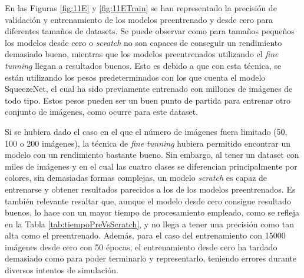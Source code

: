 \documentclass{report}
\begin{document}
En las Figuras \ref{fig:11E} y \ref{fig:11ETrain} se han representado la precisión de validación y entrenamiento de los modelos preentrenado y desde cero para diferentes tamaños de datasets. Se puede observar como para tamaños pequeños los modelos desde cero o \textit{scratch} no son capaces de conseguir un rendimiento demasiado bueno, mientras que los modelos preentrenados utilizando el \textit{fine tunning} llegan a resultados buenos. Esto es debido a que con esta técnica, se están utilizando los pesos predeterminados con los que cuenta el modelo SqueezeNet, el cual ha sido previamente entrenado con millones de imágenes de todo tipo. Estos pesos pueden ser un buen punto de partida para entrenar otro conjunto de imágenes, como ocurre para este dataset.

Si se hubiera dado el caso en el que el número de imágenes fuera limitado (50, 100 o 200 imágenes), la técnica de \textit{fine tunning} hubiera permitido encontrar un modelo con un rendimiento bastante bueno. Sin embargo, al tener un dataset con miles de imágenes y en el cual las cuatro clases se diferencian principalmente por colores, sin demasiadas formas complejas, un modelo \textit{scratch} es capaz de entrenarse y obtener resultados parecidos a los de los modelos preentrenados. Es también relevante resaltar que, aunque el modelo desde cero consigue resultado buenos, lo hace con un mayor tiempo de procesamiento empleado, como se refleja en la Tabla \ref{tab:tiempoPreVsScratch}, y no llega a tener una precisión como tan alta como el preentrenado. Además, para el caso del entrenamiento con 15000 imágenes desde cero con 50 épocas, el entrenamiento desde cero ha tardado demasiado como para poder terminarlo y representarlo, teniendo errores durante diversos intentos de simulación.
\end{document}
